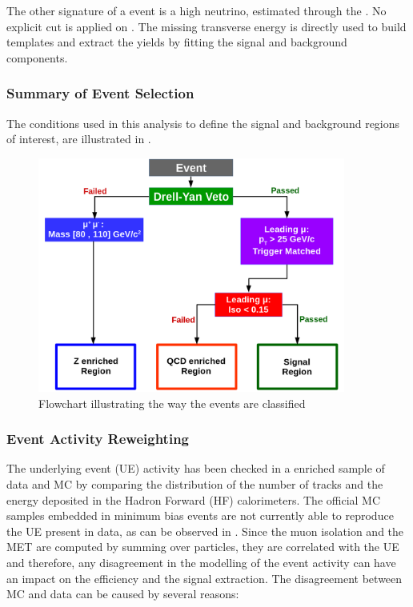 The other signature of a \W event is a high \pt neutrino, estimated through the \ETslash. No explicit cut is applied on \ETslash. The missing transverse energy is directly used to build templates and extract the yields by fitting the signal and background components.


\subsubsection{Summary of Event Selection}\label{sec:WBoson_Analysis_SignalEventSelection}

The conditions used in this analysis to define the signal and background regions of interest, are illustrated in .

\begin{figure}[htb]
 \begin{center}
   \includegraphics[width=0.9\textwidth]{Figures/WBoson/Analysis/EventSelection/FlowChar.png}
   \caption{Flowchart illustrating the way the events are classified}
   \label{fig:EventSelectionDiagram}
 \end{center}
\end{figure}


\subsubsection{Event Activity Reweighting}\label{sec:WBoson_Analysis_EventActivityReweighting}

The \pPb underlying event (UE) activity has been checked in a \DYToMuMu enriched sample of data and MC by comparing the distribution of the number of tracks and the energy deposited in the Hadron Forward (HF) calorimeters. The official MC samples embedded in \EPOS minimum bias events are not currently able to reproduce the UE present in \pPb data, as can be observed in . Since the muon isolation and the MET are computed by summing over particles, they are correlated with the UE and therefore, any disagreement in the modelling of the event activity can have an impact on the efficiency and the signal extraction. The disagreement between MC and data can be caused by several reasons:

